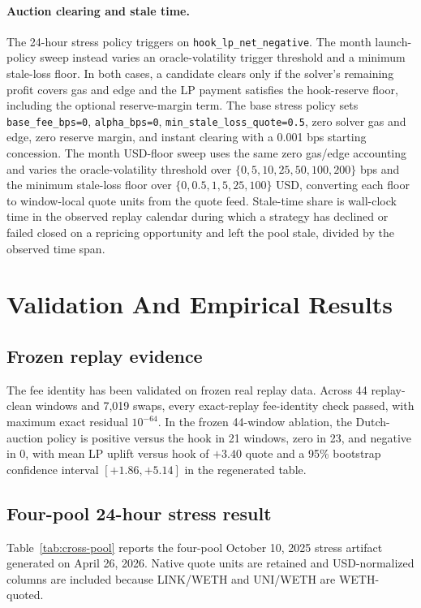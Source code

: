 \documentclass[11pt]{article}
\begin{document}
\paragraph{Auction clearing and stale time.}
The 24-hour stress policy triggers on \texttt{hook\_lp\_net\_negative}. The month launch-policy sweep instead varies an oracle-volatility trigger threshold and a minimum stale-loss floor. In both cases, a candidate clears only if the solver's remaining profit covers gas and edge and the LP payment satisfies the hook-reserve floor, including the optional reserve-margin term. The base stress policy sets \texttt{base\_fee\_bps=0}, \texttt{alpha\_bps=0}, \texttt{min\_stale\_loss\_quote=0.5}, zero solver gas and edge, zero reserve margin, and instant clearing with a 0.001 bps starting concession. The month USD-floor sweep uses the same zero gas/edge accounting and varies the oracle-volatility threshold over $\{0,5,10,25,50,100,200\}$ bps and the minimum stale-loss floor over $\{0,0.5,1,5,25,100\}$ USD, converting each floor to window-local quote units from the quote feed. Stale-time share is wall-clock time in the observed replay calendar during which a strategy has declined or failed closed on a repricing opportunity and left the pool stale, divided by the observed time span.

\section{Validation And Empirical Results}

\subsection{Frozen replay evidence}

The fee identity has been validated on frozen real replay data. Across 44 replay-clean windows and 7,019 swaps, every exact-replay fee-identity check passed, with maximum exact residual $10^{-64}$. In the frozen 44-window ablation, the Dutch-auction policy is positive versus the hook in 21 windows, zero in 23, and negative in 0, with mean LP uplift versus hook of $+3.40$ quote and a 95\% bootstrap confidence interval $[+1.86,+5.14]$ in the regenerated table.

\subsection{Four-pool 24-hour stress result}

Table~\ref{tab:cross-pool} reports the four-pool October 10, 2025 stress artifact generated on April 26, 2026. Native quote units are retained and USD-normalized columns are included because LINK/WETH and UNI/WETH are WETH-quoted.
\end{document}
